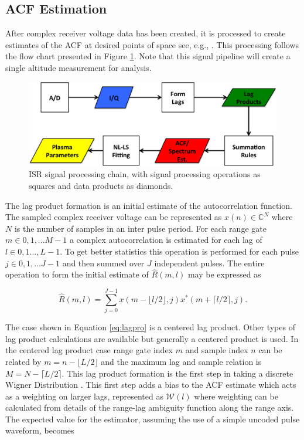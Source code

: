 \subsection{ACF Estimation}
\label{sec:acf}
After complex receiver voltage data has been created, it is processed to create estimates of the ACF at desired points of space see, e.g., \cite{farley1969,nygren1996}. This processing follows the flow chart presented in Figure \ref{fig:chain}.  Note that this signal pipeline will create a single altitude measurement for analysis. 

\begin{figure}[!t]
\centering
\includegraphics[width=6in]{datastackchain}
\caption{ISR signal processing chain, with signal processing operations as squares and data products as diamonds.}
\label{fig:chain}
\end{figure}


The lag product formation is an initial estimate of the autocorrelation function. The sampled complex receiver voltage can be represented as $x(n) \in\mathbb{C}^N$ where $N$ is the number of samples in an inter pulse period. For each range gate $m\in 0,1,...M-1$ a complex autocorrelation is estimated for each lag of $l \in 0,1...,L-1$.  To get better statistics this operation is performed for each pulse $j\in 0,1,...J-1$ and then summed over $J$ independent pulses. The entire operation to form the initial estimate of $\widehat{R}(m,l)$ may be expressed as

\begin{equation}
\label{eq:lagpro}
\widehat{R}(m,l) = \displaystyle\sum\limits_{j=0}^{J-1} x(m-\lfloor l/2\rfloor,j)x^*(m+\lceil l/2 \rceil,j).
\end{equation}

The case shown in Equation \ref{eq:lagpro} is a centered lag product.  Other types of lag product calculations are available but generally a centered product is used. In the centered lag product case range gate index $m$ and sample index $n$ can be related by $m=n-\lfloor L/2\rfloor$ and the maximum lag and sample relation is $M=N-\lceil L/2 \rceil$.  This lag product formation is the first step in taking a discrete Wigner Distribution \cite{TFAcohen}. This first step adds a bias to the ACF estimate which acts as a weighting on larger lags, represented as $\mathcal{W}(l)$ where weighting can be calculated from details of the range-lag ambiguity function along the range axis. The expected value for the estimator, assuming the use of a simple uncoded pulse waveform, becomes

